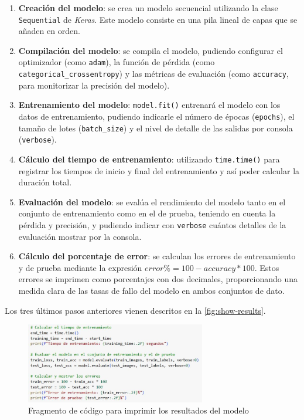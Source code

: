 \begin{enumerate}
	\item \textbf{Creación del modelo}: se crea un modelo secuencial utilizando la clase \texttt{Sequential} de \textit{Keras}. Este modelo consiste en una pila lineal de capas que se añaden en orden.
	\item \textbf{Compilación del modelo}: se compila el modelo, pudiendo configurar el optimizador (como \texttt{adam}), la función de pérdida (como \texttt{categorical\_crossentropy}) y las métricas de evaluación (como \texttt{accuracy}, para monitorizar la precisión del modelo).
	\item \textbf{Entrenamiento del modelo}: \texttt{model.fit()} entrenará el modelo con los datos de entrenamiento, pudiendo indicarle el número de épocas (\texttt{epochs}), el tamaño de lotes (\texttt{batch\_size}) y el nivel de detalle de las salidas por consola (\texttt{verbose}).
	\item \textbf{Cálculo del tiempo de entrenamiento}: utilizando \texttt{time.time()} para registrar los tiempos de inicio y final del entrenamiento y así poder calcular la duración total.
	\item \textbf{Evaluación del modelo}: se evalúa el rendimiento del modelo tanto en el conjunto de entrenamiento como en el de prueba, teniendo en cuenta la pérdida y precisión, y pudiendo indicar con \texttt{verbose} cuántos detalles de la evaluación mostrar por la consola.
	\item \textbf{Cálculo del porcentaje de error}: se calculan los errores de entrenamiento y de prueba mediante la expresión $error\% = 100 - accuracy * 100$. Estos errores se imprimen como porcentajes con dos decimales, proporcionando una medida clara de las tasas de fallo del modelo en ambos conjuntos de dato.
	
\end{enumerate}

Los tres últimos pasos anteriores vienen descritos en la \autoref{fig:show-results}.

\begin{figure}[H]
	\centering
	\includegraphics[width=0.7\textwidth]{imgs/show-results.JPG}
	\caption{Fragmento de código para imprimir los resultados del modelo}
	\label{fig:show-results}
\end{figure}
